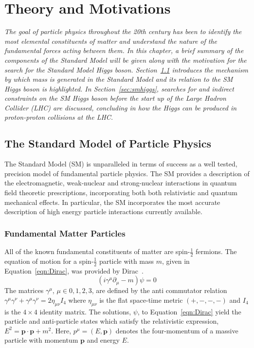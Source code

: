 \chapter{Theory and Motivations}
\label{chap:theory}

\emph{The goal of particle physics throughout the 20th century has been to identify 
the most elemental constituents of matter and understand the nature of
the fundamental forces acting between them. In this chapter, a brief summary of 
the components of the Standard Model  will be given along with the motivation for
the search for the Standard Model Higgs boson. 
Section~\ref{sec:sm} introduces the mechanism by which mass is generated in the 
Standard Model and its relation to the SM Higgs boson is highlighted.
In Section~\ref{sec:smhiggs}, 
searches for and indirect constraints on the SM Higgs boson before the start up of 
the Large Hadron Collider (LHC) are discussed, concluding in how the Higgs can be produced in proton-proton 
collisions at the LHC.}

\section{The Standard Model of Particle Physics}
\label{sec:sm}

The Standard Model (SM) is unparalleled in terms of success as 
a well tested, precision model of fundamental particle physics. 
The SM provides a description of the electromagnetic, weak-nuclear
and strong-nuclear interactions in quantum field theoretic prescriptions,
incorporating both both relativistic and quantum mechanical effects.
In particular, the SM incorporates the most accurate description of 
high energy particle interactions currently available.

\subsection{Fundamental Matter Particles}
All of the known fundamental constituents of matter
are spin-$\frac{1}{2}$ fermions. 
The equation of motion for a spin-$\frac{1}{2}$ particle with mass $m$, 
given in Equation~\ref{eqn:Dirac}, was provided by Dirac~\cite{null}.
\begin{equation}
(i\gamma^{\mu}\partial_{\mu} - m)\psi = 0
\label{eqn:Dirac}
\end{equation}
The matrices $\gamma^{\mu}$, $\mu\in{0,1,2,3}$,  are
defined by the anti commutator relation 
$\gamma^{\mu}\gamma^{\nu}+\gamma^{\mu}\gamma^{\nu} = 2\eta_{\mu\nu}I_{4}$ where
$\eta_{\mu\nu}$ is the flat space-time metric $(+,-,-,-)$ and $I_{4}$ is the $4\times4$
identity matrix.
The solutions, $\psi$, to Equation~\ref{eqn:Dirac} yield the particle and anti-particle
states which satisfy the relativistic expression, 
$E^{2} = \mathbf{p}\cdot\mathbf{p} + m^{2}$. Here, $p^{\mu} = (E,\mathbf{p})$ 
denotes the four-momentum of a massive particle with momentum $\mathbf{p}$ and energy $E$.
 
